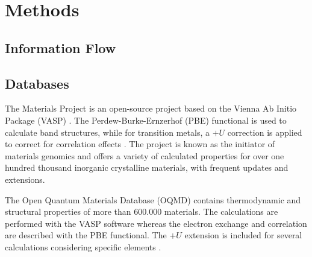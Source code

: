 \documentclass[superscriptaddress,unsortedaddress,
 amsmath,amssymb,
 aps,
]{revtex4-2}
\begin{document}



\section*{Methods}

\subsection*{Information Flow}

\subsection*{Databases} %
The Materials Project \cite{Jain2013, Jain2018} is an open-source project based on the Vienna Ab Initio Package (VASP) \cite{Kresse1996}. The Perdew-Burke-Ernzerhof \cite{Perdew1996} (PBE) functional is used to calculate band structures, while for transition metals, a $+U$ correction is applied to correct for correlation effects \cite{Wang2006}. The project is known as the initiator of materials genomics and offers a variety of calculated properties for over one hundred thousand inorganic crystalline materials, with frequent updates and extensions. 

The Open Quantum Materials Database (OQMD) \cite{Saal2013, Kirklin2015} contains thermodynamic and structural properties of more than 600.000 materials. The calculations are performed with the VASP software whereas the electron exchange and correlation are described with the PBE functional. The $+U$ extension is included for several calculations considering specific elements \cite{Stevanovic2012}. 
\end{document}
